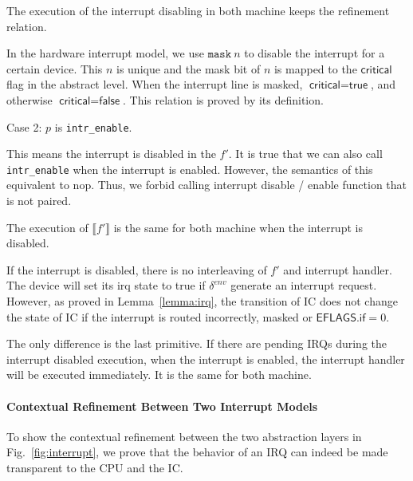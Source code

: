 {\begin{lemma}
	The execution of the interrupt disabling in both machine keeps the refinement
relation.
\end{lemma}
\noindent{}\begin{myproof}
In the hardware interrupt model, we use $\texttt{mask}~n$ to disable the
interrupt for a certain device. This $n$ is unique and the mask bit of $n$ is
mapped to the $\textsf{critical}$ flag in the abstract level. When the interrupt
line is masked, $\textsf{critical} = \textsf{true}$, and otherwise
$\textsf{critical} = \textsf{false}$. This relation is proved by its definition.
\end{myproof}

\noindent{}Case 2: $p$ is \texttt{intr\_enable}.

This means the interrupt is disabled in the $f'$. It is true that we can also
call \texttt{intr\_enable} when the interrupt is enabled. However, the semantics
of this equivalent to \textsf{nop}. Thus, we forbid calling interrupt disable /
enable function that is not paired.

\begin{lemma}
	The execution of $\llbracket f' \rrbracket$ is the same for both machine when the interrupt is disabled.
\end{lemma}
\noindent{}\begin{myproof}
If the interrupt is disabled, there is no interleaving of $f'$ and interrupt
handler. The device will set its \textsf{irq} state to \textsf{true} if
$\delta^{env}$ generate an interrupt request. However, as proved in
Lemma~\ref{lemma:irq}, the transition of IC does not change the state of IC if
the interrupt is routed incorrectly, masked or $\textsf{EFLAGS.if} = 0$.
\end{myproof}

The only difference is the last primitive. If there are pending IRQs during the
interrupt disabled execution, when the interrupt is enabled, the interrupt
handler will be executed immediately. It is the same for both machine.
}

\paragraph{Contextual Refinement Between Two Interrupt Models}
To show the contextual refinement between the two abstraction layers
in Fig.~\ref{fig:interrupt}, we prove that the behavior of an IRQ
can indeed be made transparent to the CPU and the IC.


